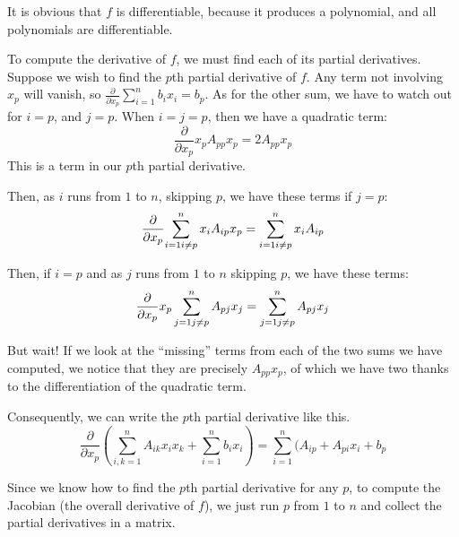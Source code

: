\documentclass[letterpaper,11pt]{article}
\newcommand{\del}[1]{\frac{\partial}{\partial#1}}
\begin{document}
\begin{enumerate}
\begin{enumerate}
                It is obvious that $f$ is differentiable, because it produces a
                polynomial, and all polynomials are differentiable.

                To compute the derivative of $f$, we must find each of its
                partial derivatives. Suppose we wish to find the $p$th partial
                derivative of $f$. Any term not involving $x_p$ will vanish, so
                $\del{x_p} {\sum_{i=1}^n {b_i x_i}} = b_p$. As for the other
                sum, we have to watch out for $i = p$, and $j = p$. When
                $i = j = p$, then we have a quadratic term:
                \begin{equation*}
                    \del{x_p} {x_p A_{pp} x_p} = 2 A_{pp} x_p
                \end{equation*}
                This is a term in our $p$th partial derivative.

                Then, as $i$ runs from $1$ to $n$, skipping $p$, we have these
                terms if $j = p$:
                \begin{equation*}
                    \del{x_p} {
                        \sum_{i=1\\i\neq p}^n x_i A_{ip} x_p
                    }
                    =
                    \sum_{i=1\\i\neq p}^n { x_i A_{ip} }
                \end{equation*}

                Then, if $i = p$ and as $j$ runs from $1$ to $n$ skipping $p$,
                we have these terms:
                \begin{equation*}
                    \del{x_p} {
                        x_p \sum_{j=1\\j\neq p}^n { A_{pj} x_j }
                    }
                    =
                    \sum_{j=1\\j\neq p}^n { A_{pj} x_j }
                \end{equation*}

                But wait! If we look at the ``missing'' terms from each of the
                two sums we have computed, we notice that they are precisely
                $A_{pp} x_p$, of which we have two thanks to the
                differentiation of the quadratic term.

                Consequently, we can write the $p$th partial derivative like
                this.
                \begin{equation*}
                    \del{x_p} {\left(
                        \sum_{i,k=1}^n A_{ik}x_ix_k + \sum_{i=1}^n b_i x_i
                    \right)}
                    =
                    \sum_{i=1}^n { (A_{ip} + A_{pi} x_i }
                    +
                    b_p
                \end{equation*}

                Since we know how to find the $p$th partial derivative for any
                $p$, to compute the Jacobian (the overall derivative of $f$),
                we just run $p$ from $1$ to $n$ and collect the partial
                derivatives in a matrix.
        \end{enumerate}
\end{enumerate}
\end{document}
